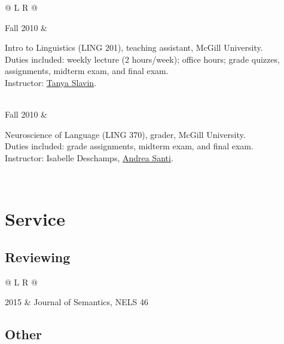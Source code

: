 \documentclass[11pt,letterpaper,twoside]{article}
\makeatletter
\newcommand{\bodywidth}{0.75}
\newcommand{\myvrule}{\color{lightgray}\vrule width 1.0pt}
\newenvironment{cvsection}{%
  \renewcommand{\arraystretch}{1.75}
  \begin{longtable}[l]{@{} L R @{}}
}{%
  \end{longtable}
}
\newcommand{\taship}[3]{%
  \parbox[t]{\bodywidth\textwidth}{#1. \\ {\footnotesize Duties included: #2.
  \\ Instructor: #3.}}
}
\makeatother
\begin{document}
\begin{cvsection}
  {\small Fall} 2010 & \taship{Intro to Linguistics (LING 201), teaching
  assistant, McGill University}{weekly lecture (2 hours/week); office hours;
  grade quizzes, assignments, midterm exam, and final
  exam}{\href{https://sites.google.com/site/tanyaslavin/}{Tanya Slavin}}
  \\[0.10ex]

  {\small Fall} 2010 & \taship{Neuroscience of Language (LING 370),
  grader, McGill University}{grade assignments, midterm exam, and final
  exam}{Isabelle Deschamps,
  \href{http://www.ucl.ac.uk/pals/people/profiles/academic-staff/andrea-santi}{Andrea
    Santi}} \\
\end{cvsection}

\section*{Service}

\subsection*{Reviewing}

\begin{cvsection}
  2015 & Journal of Semantics, NELS 46
\end{cvsection}

\subsection*{Other}
\end{document}

